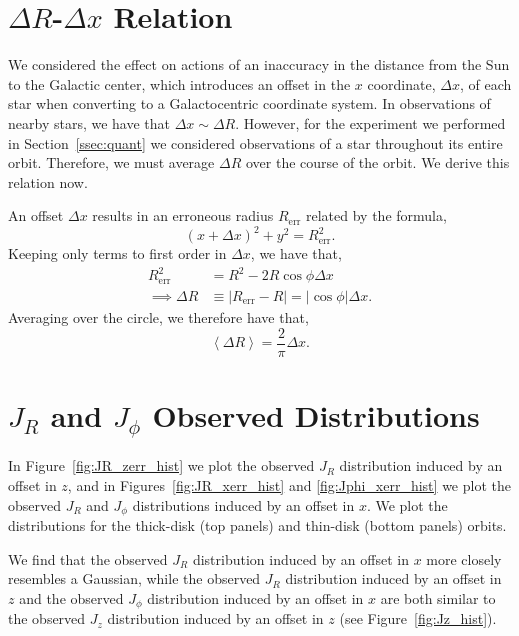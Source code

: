 \documentclass[twocolumn]{aastex62}
\newcommand{\abs}[1]{\left| #1 \right|}
\newcommand{\avg}[1]{\left< #1 \right>}
\newcommand{\beq}{\begin{equation}}
\newcommand{\eeq}{\end{equation}}
\begin{document}
\section{$\Delta R$-$\Delta x$ Relation} \label{app:deltax}
We considered the effect on actions of an inaccuracy in the distance from the
Sun to the Galactic center, which introduces an offset in the $x$ coordinate,
$\Delta x$, of each star when converting to a Galactocentric coordinate
system. In observations of nearby stars, we have that $\Delta x \sim \Delta
R$. However, for the experiment we performed in Section~\ref{ssec:quant} we
considered observations of a star throughout its entire orbit. Therefore, we
must average $\Delta R$ over the course of the orbit. We derive this relation
now.

An offset $\Delta x$ results in an erroneous radius $R_{\text{err}}$ related by
the formula,
\beq
(x+\Delta x)^2 + y^2 = R_{\text{err}}^2\text{.}
\eeq
Keeping only terms to first order in $\Delta x$, we have that,
\beq
\begin{split}
R_{\text{err}}^2 &= R^2 - 2 R \cos{\phi} \Delta x \\
\implies \Delta R &\equiv \abs{R_{\text{err}} - R} 
        = \abs{\cos{\phi}} \Delta x\text{.}
\end{split}
\eeq
Averaging over the circle, we therefore have that,
\beq
\avg{\Delta R} = \frac{2}{\pi} \Delta x\text{.}
\eeq

\section{$J_R$ and $J_{\phi}$ Observed Distributions} \label{app:hist}

In Figure~\ref{fig:JR_zerr_hist} we plot the observed $J_R$ distribution
induced by an offset in $z$, and in Figures~\ref{fig:JR_xerr_hist} and
\ref{fig:Jphi_xerr_hist} we plot the observed $J_R$ and $J_{\phi}$
distributions induced by an offset in $x$. We plot the distributions for the
thick-disk (top panels) and thin-disk (bottom panels) orbits.

We find that the observed $J_R$ distribution induced by an offset in $x$ more
closely resembles a Gaussian, while the observed $J_R$ distribution induced by
an offset in $z$ and the observed $J_{\phi}$ distribution induced by an offset
in $x$ are both similar to the observed $J_z$ distribution induced by an
offset in $z$ (see Figure~\ref{fig:Jz_hist}).
\end{document}
